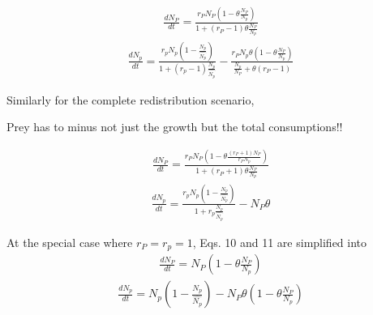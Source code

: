 \documentclass[12pt]{article}
\begin{document}
 \begin{equation}
 \begin{split}
 \frac{d N_P}{d t} = \frac{r_{P} N_P (1 - \theta \frac{N_{P}}{N_{p}} )}{ 1+ (r_{P}-1) \theta \frac{N_{P}}{N_{p}}} 
\end{split}
\end{equation}
 \begin{equation}
 \begin{split}
 \frac{d N_p}{d t} = \frac{r_{p} N_p (1 - \frac {N_p}{\hat{N_p} })}{ 1 + (r_p-1) \frac {N_p}{\hat{N_p} }} - \frac{r_{P} N_p \theta (1 - \theta  \frac{N_{P}}{N_{p}} )}{  \frac{N_{p}}{N_{P}} +  \theta (r_{P}-1)} 
\end{split}
\end{equation}


Similarly for the complete redistribution scenario,

Prey has to minus not just the growth but the total consumptions!!

 \begin{equation}
 \begin{split}
 \frac{d N_P}{d t} = \frac{r_{P} N_P ( 1 -  \theta  \frac{(r_{P} +1)N_{P}}{r_P N_{p}} )}{ 1+ (r_{P}+1) \theta \frac{N_{P}}{N_{p}}} 
\end{split}
\end{equation}
 \begin{equation}
 \begin{split}
 \frac{d N_p}{d t} = \frac{r_{p} N_p (1 - \frac {N_p}{\hat{N_p} })}{ 1 + r_p \frac {N_p}{\hat{N_p} }}   - N_P  \theta
\end{split}
\end{equation}


At the special case where $r_P = r_p = 1$, Eqs. 10 and 11 are simplified into
 \begin{equation}
 \begin{split}
 \frac{d N_P}{d t} =  N_P (1 - \theta \frac{N_{P}}{N_{p}} )
\end{split}
\end{equation}
 \begin{equation}
 \begin{split}
 \frac{d N_p}{d t} = N_p (1 - \frac {N_p}{\hat{N_p} }) - N_P \theta (1 - \theta  \frac{N_{P}}{N_{p}} )
\end{split}
\end{equation}
\end{document}
